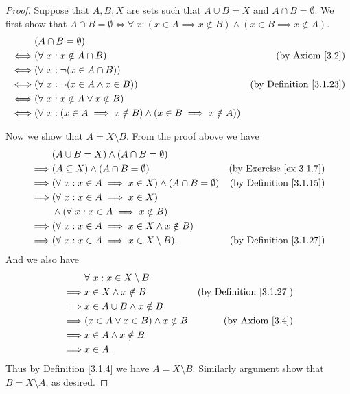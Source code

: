 \begin{proof}
Suppose that \(A, B, X\) are sets such that \(A \cup B = X\) and \(A \cap B = \emptyset\).
We first show that \(A \cap B = \emptyset \iff \forall\ x : (x \in A \implies x \notin B) \land (x \in B \implies x \notin A)\).
\begin{align*}
& (A \cap B = \emptyset) \\
\iff & (\forall\ x : x \notin A \cap B) & \text{(by Axiom \ref{3.2})} \\
\iff & (\forall\ x : \lnot (x \in A \cap B)) \\
\iff & (\forall\ x : \lnot (x \in A \land x \in B)) & \text{(by Definition \ref{3.1.23})} \\
\iff & (\forall\ x : x \notin A \lor x \notin B) \\
\iff & (\forall\ x : (x \in A \implies x \notin B) \land (x \in B \implies x \notin A)) \\
\end{align*}

Now we show that \(A = X \setminus B\).
From the proof above we have
\begin{align*}
& (A \cup B = X) \land (A \cap B = \emptyset) \\
\implies & (A \subseteq X) \land (A \cap B = \emptyset) & \text{(by Exercise \ref{ex 3.1.7})} \\
\implies & (\forall\ x : x \in A \implies x \in X) \land (A \cap B = \emptyset) & \text{(by Definition \ref{3.1.15})} \\
\implies & (\forall\ x : x \in A \implies x \in X) \\
& \land (\forall\ x : x \in A \implies x \notin B) \\
\implies & (\forall\ x : x \in A \implies x \in X \land x \notin B) \\
\implies & (\forall\ x : x \in A \implies x \in X \setminus B). & \text{(by Definition \ref{3.1.27})}
\end{align*}
And we also have
\begin{align*}
& \forall\ x : x \in X \setminus B \\
\implies & x \in X \land x \notin B & \text{(by Definition \ref{3.1.27})} \\
\implies & x \in A \cup B \land x \notin B \\
\implies & (x \in A \lor x \in B) \land x \notin B & \text{(by Axiom \ref{3.4})} \\
\implies & x \in A \land x \notin B \\
\implies & x \in A.
\end{align*}
Thus by Definition \ref{3.1.4} we have \(A = X \setminus B\).
Similarly argument show that \(B = X \setminus A\), as desired.
\end{proof}

